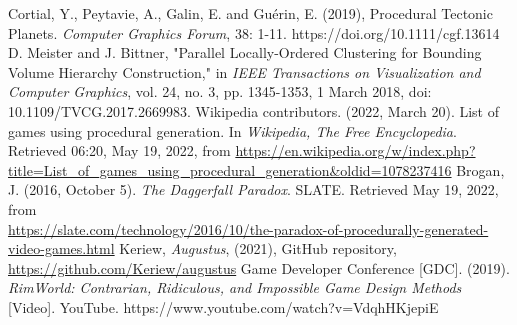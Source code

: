 \begin{thebibliography}{9}
Cortial, Y., Peytavie, A., Galin, E. and Guérin, E. (2019), Procedural Tectonic Planets. \textit{Computer Graphics Forum}, 38: 1-11. https://doi.org/10.1111/cgf.13614
D. Meister and J. Bittner, "Parallel Locally-Ordered Clustering for Bounding Volume Hierarchy Construction," in \textit{IEEE Transactions on Visualization and Computer Graphics}, vol. 24, no. 3, pp. 1345-1353, 1 March 2018, doi: 10.1109/TVCG.2017.2669983.
Wikipedia contributors. (2022, March 20). List of games using procedural generation. In \textit{Wikipedia, The Free Encyclopedia}. Retrieved 06:20, May 19, 2022, from \url{https://en.wikipedia.org/w/index.php?title=List\_of\_games\_using\_procedural\_generation\&oldid=1078237416}
Brogan, J. (2016, October 5). \textit{The Daggerfall Paradox}. SLATE. Retrieved May 19, 2022, from\\ \url{https://slate.com/technology/2016/10/the-paradox-of-procedurally-generated-video-games.html}
Keriew, \textit{Augustus}, (2021), GitHub repository, \url{https://github.com/Keriew/augustus}
Game Developer Conference [GDC]. (2019). \textit{RimWorld: Contrarian, Ridiculous, and Impossible Game Design Methods} [Video]. YouTube. https://www.youtube.com/watch?v=VdqhHKjepiE
\end{thebibliography}